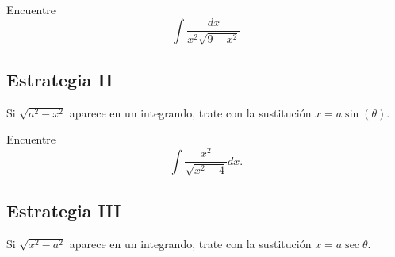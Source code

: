 \begin{problema}
 \label{ayr:exmp:32.12}
 Encuentre $$
 \displaystyle \int \dfrac{dx}{x^{2}\sqrt{9-x^{2}}}
 $$
\end{problema}



\subsection{Estrategia II}
 
 Si $\sqrt{a^{2}-x^{2}}$ aparece en un integrando, trate con la sustituci\'on $x=a\sin(\theta).$





\begin{problema}
\label{ayr:exmp:32.13}
Encuentre 
$$
\displaystyle \int \dfrac{x^{2}}{\sqrt{x^{2}-4}}dx.
$$
\end{problema}



\subsection{Estrategia III}
  Si $\sqrt{x^{2}-a^{2}}$ aparece en un integrando, trate con la sustituci\'on $x=a\sec{\theta}.$


